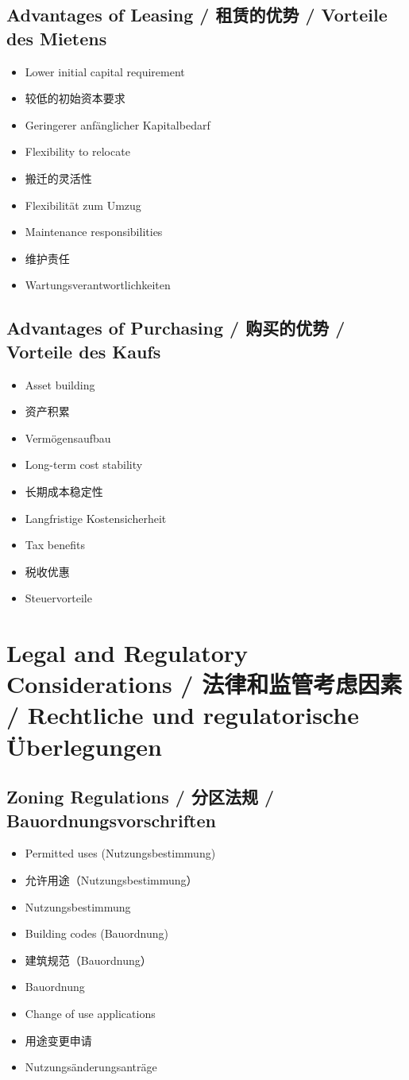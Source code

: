 \subsection{Advantages of Leasing / 租赁的优势 / Vorteile des Mietens}
\begin{itemize}
    \item Lower initial capital requirement
    \item 较低的初始资本要求
    \item Geringerer anfänglicher Kapitalbedarf
    \item Flexibility to relocate
    \item 搬迁的灵活性
    \item Flexibilität zum Umzug
    \item Maintenance responsibilities
    \item 维护责任
    \item Wartungsverantwortlichkeiten
\end{itemize}

\subsection{Advantages of Purchasing / 购买的优势 / Vorteile des Kaufs}
\begin{itemize}
    \item Asset building
    \item 资产积累
    \item Vermögensaufbau
    \item Long-term cost stability
    \item 长期成本稳定性
    \item Langfristige Kostensicherheit
    \item Tax benefits
    \item 税收优惠
    \item Steuervorteile
\end{itemize}

\section{Legal and Regulatory Considerations / 法律和监管考虑因素 / Rechtliche und regulatorische Überlegungen}

\subsection{Zoning Regulations / 分区法规 / Bauordnungsvorschriften}
\begin{itemize}
    \item Permitted uses (Nutzungsbestimmung)
    \item 允许用途（Nutzungsbestimmung）
    \item Nutzungsbestimmung
    \item Building codes (Bauordnung)
    \item 建筑规范（Bauordnung）
    \item Bauordnung
    \item Change of use applications
    \item 用途变更申请
    \item Nutzungsänderungsanträge
\end{itemize}

